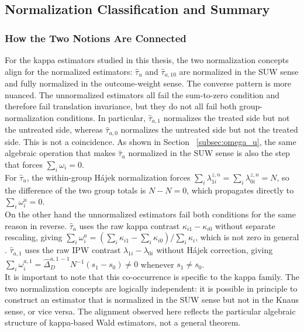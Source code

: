 \documentclass[12pt, a4paper, oneside]{article}
\theoremstyle{plain}
\theoremstyle{definition}
\begin{document}
\newpage
 

\subsection{Normalization Classification and Summary}
\label{subsec:classification}


\subsubsection{How the Two Notions Are Connected}
\label{sssec:norm_connection}

For the kappa estimators studied in this thesis, the two normalization concepts align
for the normalized estimators: $\hat\tau_u$ and $\hat\tau_{a,10}$ are normalized in the
SUW sense and fully normalized in the outcome-weight sense. The converse pattern is
more nuanced. The unnormalized estimators all fail the sum-to-zero condition and
therefore fail translation invariance, but they do not all fail both group-normalization
conditions. In particular, $\hat\tau_{a,1}$ normalizes the treated side but not the
untreated side, whereas $\hat\tau_{a,0}$ normalizes the untreated side but not the
treated side. This is not
a coincidence. As shown in Section ~\ref{subsec:omega_u},
the same algebraic operation that makes $\hat\tau_u$  normalized
in the SUW sense is also the step that forces $\sum_i \omega_i = 0$.\\For
$\hat\tau_u$, the within-group Hájek normalization forces $\sum_i \lambda_{1i}^{z,n} =
\sum_i \lambda_{0i}^{z,n} = N$, so the difference of the two group totals is $N - N = 0$,
which propagates directly to $\sum_i \omega_i^u = 0$.\\
On the other hand the unnormalized estimators fail both conditions for the same reason in reverse.
$\hat\tau_a$ uses the raw kappa contrast $\kappa_{i1} - \kappa_{i0}$ without separate
rescaling, giving $\sum_i \omega_i^a = (\sum_i \kappa_{i1} - \sum_i \kappa_{i0}) /
\sum_i \kappa_i$, which is not zero in general \citep[Appendix~A.4]{knaus2024treatment}.
$\hat\tau_{a,1}$ uses the raw IPW contrast $\lambda_{1i} - \lambda_{0i}$ without
Hájek correction, giving $\sum_i \omega_i^{a,1} = \widehat\Delta_D^{a,1\,-1} N^{-1}
(s_1 - s_0) \neq 0$ whenever $s_1 \neq s_0$.\\
It is important to note that this co-occurrence is specific to the kappa family. The two
normalization concepts are logically independent: it is possible in principle to construct
an estimator that is normalized in the SUW sense but not in the Knaus sense, or vice
versa. The alignment observed here reflects the particular algebraic structure of
kappa-based Wald estimators, not a general theorem.
\end{document}
